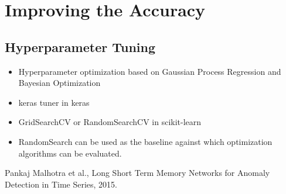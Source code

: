 \documentclass[a4paper, 12pt]{report}
\begin{document}
\chapter{Improving the Accuracy}
\section{Hyperparameter Tuning}
\begin{itemize}
\item Hyperparameter optimization based on Gaussian Process Regression and Bayesian Optimization
\item keras tuner in keras
\item GridSearchCV or RandomSearchCV in scikit-learn
\item RandomSearch can be used as the baseline against which optimization algorithms can be evaluated.
\end{itemize}

\begin{thebibliography}{999}
	Pankaj Malhotra et al.,
	Long Short Term Memory Networks for Anomaly Detection in Time Series,
	2015.
\end{thebibliography}
\end{document}
